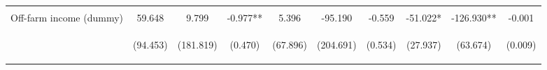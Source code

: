 \begin{center}
\begin{tabular}{lccccccccc}
\vspace{4pt} & \begin{footnotesize}[0.784]\end{footnotesize} & \begin{footnotesize}[0.000]\end{footnotesize} & \begin{footnotesize}[0.192]\end{footnotesize} & \begin{footnotesize}[0.063]\end{footnotesize} & \begin{footnotesize}[0.000]\end{footnotesize} & \begin{footnotesize}[0.000]\end{footnotesize} & \begin{footnotesize}[0.727]\end{footnotesize} & \begin{footnotesize}[0.000]\end{footnotesize} & \begin{footnotesize}[0.242]\end{footnotesize} \\
Off-farm income (dummy) & 59.648 & 9.799 & -0.977** & 5.396 & -95.190 & -0.559 & -51.022* & -126.930** & -0.001 \\
 & \begin{footnotesize}(94.453)\end{footnotesize} & \begin{footnotesize}(181.819)\end{footnotesize} & \begin{footnotesize}(0.470)\end{footnotesize} & \begin{footnotesize}(67.896)\end{footnotesize} & \begin{footnotesize}(204.691)\end{footnotesize} & \begin{footnotesize}(0.534)\end{footnotesize} & \begin{footnotesize}(27.937)\end{footnotesize} & \begin{footnotesize}(63.674)\end{footnotesize} & \begin{footnotesize}(0.009)\end{footnotesize} \\

\end{tabular}
\end{center}
